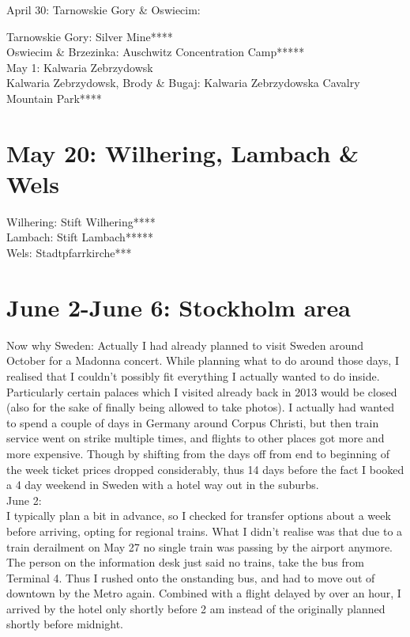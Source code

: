 April 30: Tarnowskie Gory \& Oswiecim:

Tarnowskie Gory: Silver Mine****\\

Oswiecim \& Brzezinka:  Auschwitz Concentration Camp*****\\

May 1: Kalwaria Zebrzydowsk\\

Kalwaria Zebrzydowsk, Brody \& Bugaj: Kalwaria Zebrzydowska Cavalry Mountain Park****\\

\section{May 20: Wilhering, Lambach \& Wels}
\label{2023:Lambach}

Wilhering: Stift Wilhering****\\
Lambach: Stift Lambach*****\\
Wels: Stadtpfarrkirche***\\

\section{June 2-June 6: Stockholm area}
\label{2023:StockholmI}

Now why Sweden: Actually I had already planned to visit Sweden around October for a Madonna concert. While planning what to do around those days, I realised that I couldn't possibly fit everything I actually wanted to do inside. Particularly certain palaces which I visited already back in 2013 would be closed (also for the sake of finally being allowed to take photos). I actually had wanted to spend a couple of days in Germany around Corpus Christi, but then train service went on strike multiple times, and flights to other places got more and more expensive. Though by shifting from the days off from end to beginning of the week ticket prices dropped considerably, thus 14 days before the fact I booked a 4 day weekend in Sweden with a hotel way out in the suburbs.\\

June 2:\\
I typically plan a bit in advance, so I checked for transfer options about a week before arriving, opting for regional trains. What I didn't realise was that due to a train derailment on May 27 no single train was passing by the airport anymore. The person on the information desk just said no trains, take the bus from Terminal 4. Thus I rushed onto the onstanding bus, and had to move out of downtown by the Metro again. Combined with a flight delayed by over an hour, I arrived by the hotel only shortly before 2 am instead of the originally planned shortly before midnight.\\


